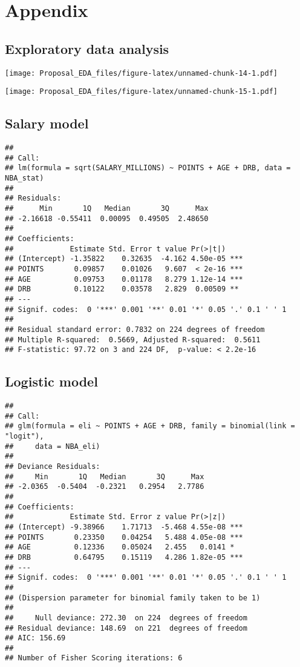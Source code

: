 \documentclass[12pt,]{article}
\begin{document}
\newpage

\section{Appendix}

\subsection{Exploratory data analysis}\label{EDA}

\texttt{[image: Proposal\_EDA\_files/figure-latex/unnamed-chunk-14-1.pdf]}

\texttt{[image: Proposal\_EDA\_files/figure-latex/unnamed-chunk-15-1.pdf]}

\subsection{Salary model}\label{SM}

\begin{verbatim}
## 
## Call:
## lm(formula = sqrt(SALARY_MILLIONS) ~ POINTS + AGE + DRB, data = NBA_stat)
## 
## Residuals:
##      Min       1Q   Median       3Q      Max 
## -2.16618 -0.55411  0.00095  0.49505  2.48650 
## 
## Coefficients:
##             Estimate Std. Error t value Pr(>|t|)    
## (Intercept) -1.35822    0.32635  -4.162 4.50e-05 ***
## POINTS       0.09857    0.01026   9.607  < 2e-16 ***
## AGE          0.09753    0.01178   8.279 1.12e-14 ***
## DRB          0.10122    0.03578   2.829  0.00509 ** 
## ---
## Signif. codes:  0 '***' 0.001 '**' 0.01 '*' 0.05 '.' 0.1 ' ' 1
## 
## Residual standard error: 0.7832 on 224 degrees of freedom
## Multiple R-squared:  0.5669, Adjusted R-squared:  0.5611 
## F-statistic: 97.72 on 3 and 224 DF,  p-value: < 2.2e-16
\end{verbatim}

\subsection{Logistic model}\label{LM}

\begin{verbatim}
## 
## Call:
## glm(formula = eli ~ POINTS + AGE + DRB, family = binomial(link = "logit"), 
##     data = NBA_eli)
## 
## Deviance Residuals: 
##     Min       1Q   Median       3Q      Max  
## -2.0365  -0.5404  -0.2321   0.2954   2.7786  
## 
## Coefficients:
##             Estimate Std. Error z value Pr(>|z|)    
## (Intercept) -9.38966    1.71713  -5.468 4.55e-08 ***
## POINTS       0.23350    0.04254   5.488 4.05e-08 ***
## AGE          0.12336    0.05024   2.455   0.0141 *  
## DRB          0.64795    0.15119   4.286 1.82e-05 ***
## ---
## Signif. codes:  0 '***' 0.001 '**' 0.01 '*' 0.05 '.' 0.1 ' ' 1
## 
## (Dispersion parameter for binomial family taken to be 1)
## 
##     Null deviance: 272.30  on 224  degrees of freedom
## Residual deviance: 148.69  on 221  degrees of freedom
## AIC: 156.69
## 
## Number of Fisher Scoring iterations: 6
\end{verbatim}
\end{document}
